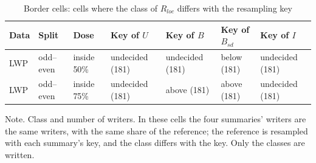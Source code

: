 \begin{table}[htbp]
\caption{Border cells: cells where the class of $R_{loc}$ differs with the resampling key}
\label{tab:border}
\footnotesize
\begin{tabularx}{\linewidth}{@{}lllXXXX@{}}
\toprule
Data & Split & Dose & Key of $U$ & Key of $B$ & Key of $B_{sd}$ & Key of $I$ \\
\midrule
LWP & odd--even & inside 50\% & undecided (181) & undecided (181) & below (181) & undecided (181) \\
LWP & odd--even & inside 75\% & undecided (181) & above (181) & above (181) & undecided (181) \\
\bottomrule
\end{tabularx}
\par\smallskip\footnotesize Note. Class and number of writers. In these cells the four summaries' writers are the same writers, with the same share of the reference; the reference is resampled with each summary's key, and the class differs with the key. Only the classes are written.
\end{table}
